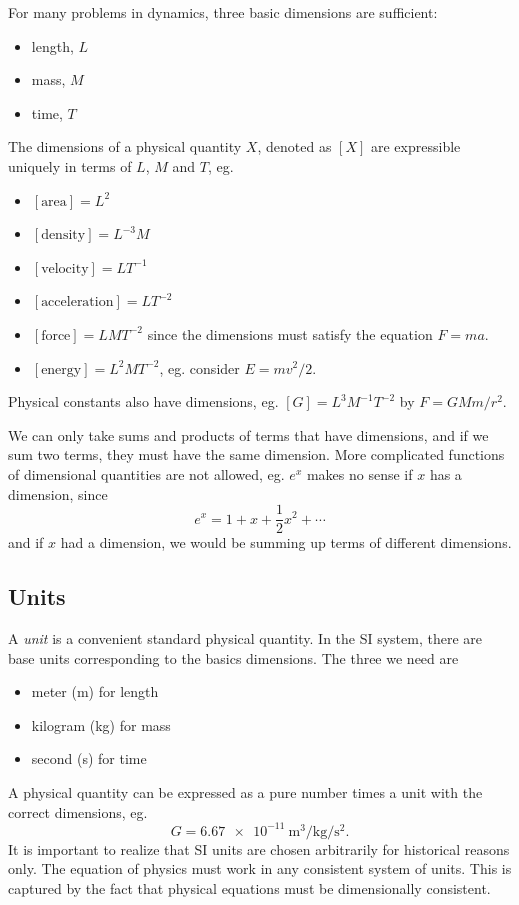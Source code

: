 \documentclass[a4paper]{article}
\begin{document}
For many problems in dynamics, three basic dimensions are sufficient:
\begin{itemize}
  \item length, $L$
  \item mass, $M$
  \item time, $T$
\end{itemize}

The dimensions of a physical quantity $X$, denoted as $[X]$ are expressible uniquely in terms of $L$, $M$ and $T$, eg.
\begin{itemize}
  \item $[\text{area}] = L^2$
  \item $[\text{density}] = L^{-3} M$
  \item $[\text{velocity}] = LT^{-1}$
  \item $[\text{acceleration}] = LT^{-2}$
  \item $[\text{force}] = LMT^{-2}$ since the dimensions must satisfy the equation $F = ma$.
  \item $[\text{energy}] = L^2MT^{-2}$, eg. consider $E = mv^2/2$.
\end{itemize}

Physical constants also have dimensions, eg. $[G] = L^3M^{-1}T^{-2}$ by $F = GMm/r^2$.

We can only take sums and products of terms that have dimensions, and if we sum two terms, they must have the same dimension. More complicated functions of dimensional quantities are not allowed, eg. $e^{x}$ makes no sense if $x$ has a dimension, since
\[
  e^x = 1 + x + \frac{1}{2}x^2 + \cdots
\]
and if $x$ had a dimension, we would be summing up terms of different dimensions.

\subsection{Units}
A \emph{unit} is a convenient standard physical quantity. In the SI system, there are base units corresponding to the basics dimensions. The three we need are 
\begin{itemize}
  \item meter (m) for length
  \item kilogram (kg) for mass
  \item second (s) for time
\end{itemize}
A physical quantity can be expressed as a pure number times a unit with the correct dimensions, eg.
\[
  G = \SI{6.67e-11}{\meter\cubed\per\kilogram\per\second\squared}.
\]
It is important to realize that SI units are chosen arbitrarily for historical reasons only. The equation of physics must work in any consistent system of units. This is captured by the fact that physical equations must be dimensionally consistent.
\end{document}
